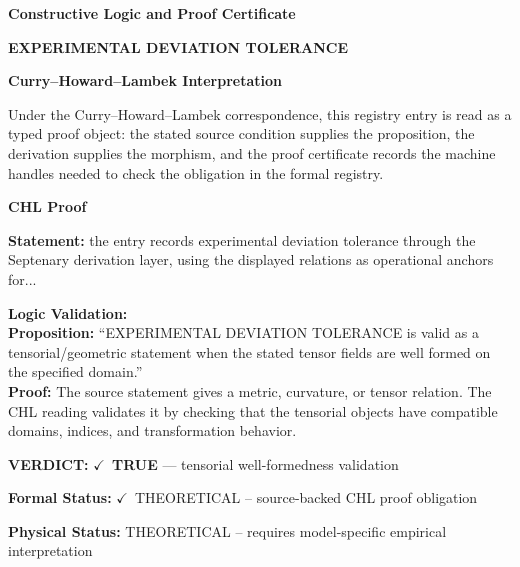 \clearpage
\begingroup\tzpsupportsetup
\noindent\textbf{\fontsize{10.8pt}{12.8pt}\selectfont [ID 0630] Constructive Logic and Proof Certificate}\par
\noindent\textbf{\fontsize{10pt}{12pt}\selectfont EXPERIMENTAL DEVIATION TOLERANCE}\par
\vspace{0.45em}
\begingroup
\footnotesize
\setlength{\parskip}{0.22em}
\setlength{\parindent}{0pt}
\noindent\textbf{Curry--Howard--Lambek Interpretation}\par
Under the Curry--Howard--Lambek correspondence, this registry entry is read as a typed proof
object: the stated source condition supplies the proposition, the derivation supplies the
morphism, and the proof certificate records the machine handles needed to check the obligation
in the formal registry.

\vspace{0.45em}
\noindent\textbf{CHL Proof}\par
\textbf{Statement:} the entry records experimental deviation tolerance through the Septenary derivation
layer, using the displayed relations as operational anchors for...

\textbf{Logic Validation:}\\
\textbf{Proposition:} ``EXPERIMENTAL DEVIATION TOLERANCE is valid as a tensorial/geometric statement when the
stated tensor fields are well formed on the specified domain.''\\
\textbf{Proof:} The source statement gives a metric, curvature, or tensor relation. The CHL reading
validates it by checking that the tensorial objects have compatible domains, indices,
and transformation behavior.

\textbf{VERDICT:} \ensuremath{\checkmark}\ \textbf{TRUE} --- tensorial well-formedness validation

\textbf{Formal Status:} \ensuremath{\checkmark}\ THEORETICAL -- source-backed CHL proof obligation

\textbf{Physical Status:} THEORETICAL -- requires model-specific empirical interpretation
\par\vspace{0.45em}
\par
\ifTZPDarkEdition
{}
\fi
\endgroup
\endgroup
